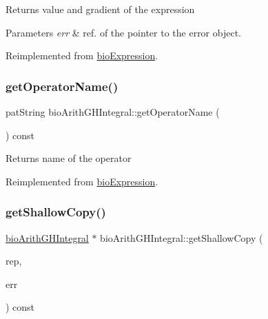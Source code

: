 \begin{DoxyReturn}{Returns}
value and gradient of the expression 
\end{DoxyReturn}

\begin{DoxyParams}{Parameters}
{\em err} & ref. of the pointer to the error object. \\
\hline
\end{DoxyParams}


Reimplemented from \hyperlink{classbio_expression_a91c81ce80c9e972c913b10f5f3c1ed13}{bio\+Expression}.

\mbox{\label{classbio_arith_g_h_integral_a2eeabe5fdedaee0370596b34d7731b77}} 
\subsubsection{\texorpdfstring{get\+Operator\+Name()}{getOperatorName()}}
{\footnotesize\ttfamily pat\+String bio\+Arith\+G\+H\+Integral\+::get\+Operator\+Name (\begin{DoxyParamCaption}{ }\end{DoxyParamCaption}) const\hspace{0.3cm}{\ttfamily [virtual]}}

\begin{DoxyReturn}{Returns}
name of the operator 
\end{DoxyReturn}


Reimplemented from \hyperlink{classbio_expression_a2353a4afb3a2b0af7c63aba086a72bde}{bio\+Expression}.

\mbox{\label{classbio_arith_g_h_integral_a15d9820a85bd45e3643c6bd15752cfe2}} 
\subsubsection{\texorpdfstring{get\+Shallow\+Copy()}{getShallowCopy()}}
{\footnotesize\ttfamily \hyperlink{classbio_arith_g_h_integral}{bio\+Arith\+G\+H\+Integral} $\ast$ bio\+Arith\+G\+H\+Integral\+::get\+Shallow\+Copy (\begin{DoxyParamCaption}\item[{\hyperlink{classbio_expression_repository}{bio\+Expression\+Repository} $\ast$}]{rep,  }\item[{pat\+Error $\ast$\&}]{err }\end{DoxyParamCaption}) const\hspace{0.3cm}{\ttfamily [virtual]}}


